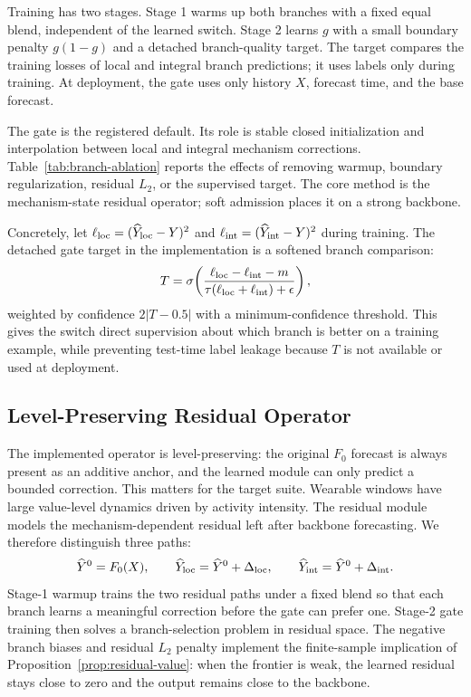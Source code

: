 ﻿\documentclass[10pt,conference]{IEEEtran}
\begin{document}
Training has two stages.  Stage 1 warms up both branches with a fixed equal
blend, independent of the learned switch.  Stage 2 learns \(g\) with a
small boundary penalty \(g(1-g)\) and a detached branch-quality target.  The
target compares the training losses of local and integral branch predictions;
it uses labels only during training.  At deployment, the gate uses only
history \(X\), forecast time, and the base forecast.

The gate is the registered default.  Its role is stable closed initialization
and interpolation between local and integral mechanism corrections.
Table~\ref{tab:branch-ablation} reports the effects of removing warmup,
boundary regularization, residual \(L_2\), or the supervised target.  The core method is the
mechanism-state residual operator; soft admission places it on a strong
backbone.

Concretely, let
\(\ell_{\rm loc}=(\widehat{Y}_{\rm loc}-Y)^2\) and
\(\ell_{\rm int}=(\widehat{Y}_{\rm int}-Y)^2\) during training.  The detached
gate target in the implementation is a softened branch comparison:
\begin{equation}
T=\sigma\!\left(
\frac{\ell_{\rm loc}-\ell_{\rm int}-m}
{\tau(\ell_{\rm loc}+\ell_{\rm int})+\epsilon}
\right),
\end{equation}
weighted by confidence \(2|T-0.5|\) with a minimum-confidence threshold.
This gives the switch direct supervision about which branch is better on a
training example, while preventing test-time label leakage because \(T\) is not
available or used at deployment.

\subsection{Level-Preserving Residual Operator}

The implemented operator is level-preserving: the original \(F_0\) forecast is
always present as an additive anchor, and the learned module can only predict a
bounded correction.  This matters for the target suite.  Wearable windows have
large value-level dynamics driven by activity intensity.  The residual module
models the mechanism-dependent residual left after backbone forecasting.  We therefore
distinguish three paths:
\[
\widehat Y^0=F_0(X),\qquad
\widehat Y_{\rm loc}=\widehat Y^0+\Delta_{\rm loc},\qquad
\widehat Y_{\rm int}=\widehat Y^0+\Delta_{\rm int}.
\]
Stage-1 warmup trains the two residual paths under a fixed blend so that each
branch learns a meaningful correction before the gate can prefer one.  Stage-2
gate training then solves a branch-selection problem in residual space.  The negative branch biases and
residual \(L_2\) penalty implement the finite-sample implication of
Proposition~\ref{prop:residual-value}: when the frontier is weak, the learned
residual stays close to zero and the output remains close to the backbone.
\end{document}
